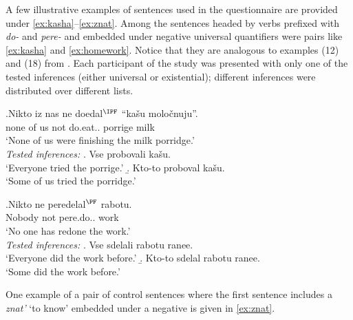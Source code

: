 A few illustrative examples of sentences used in the questionnaire are provided under \ref{ex:kasha}--\ref{ex:znat}. Among the sentences headed by verbs prefixed with \textit{do-} and \textit{pere-} and embedded under negative universal quantifiers were pairs like \ref{ex:kasha} and \ref{ex:homework}. Notice that they are analogous to examples (12) and (18) from \citealt{Chemla:09}. Each participant  of the study was presented with only one of the tested inferences (either universal or existential); different inferences were distributed over different lists.

\exg.\label{ex:kasha}Nikto iz nas ne doedal$^{\IPF}$ ``ka\v{s}u molo\v{c}nuju''.\\
none of us not do.eat.. porrige milk\\
\trans `None of us were finishing the milk porridge.'\smallskip\\
\textit{Tested inferences:}
\a. Vse probovali ka\v{s}u.\\
`Everyone tried the porrige.'
\b. Kto-to proboval ka\v{s}u.\\
`Some of us tried the porridge.'


\exg.\label{ex:homework}Nikto ne peredelal$^{\PF}$ rabotu.\\
Nobody not pere.do.. work\\
\trans `No one has redone the work.'\smallskip\\
\textit{Tested inferences:}
\a. \label{test:homework1}Vse sdelali rabotu ranee.\\
`Everyone did the work before.'
\b. \label{test:homework2}Kto-to sdelal rabotu ranee.\\
`Some did the work before.'


One example of a pair of control sentences where the first sentence includes a  \textit{znat'} `to know' embedded under a negative  is given in \ref{ex:znat}.

